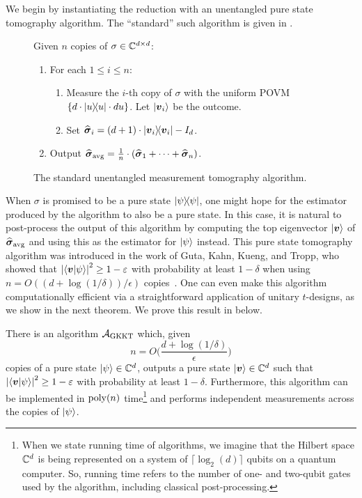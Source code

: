 \documentclass{article}
\newcommand{\gkkt}{\calA_{\mathrm{GKKT}}}
\begin{document}
We begin by instantiating the reduction with an unentangled pure state tomography algorithm.
The ``standard'' such algorithm is given in .

{
\begin{figure}[H]
Given $n$ copies of $\sigma \in \mathbb C^{d \times d}$:
\begin{enumerate}
    \item For each $1 \leq i \leq n$:
        \begin{enumerate}
            \item Measure the $i$-th copy of $\sigma$ with the uniform POVM $\{d \cdot \ketbra{u} \cdot du\}$. Let $\ket{\boldsymbol{v}_i}$ be the outcome.
            \item Set $\widehat{\boldsymbol{\sigma}}_i = (d+1) \cdot \ketbra{\boldsymbol{v}_i} - I_d$.
        \end{enumerate}
    \item Output $\widehat{\boldsymbol{\sigma}}_{\mathrm{avg}} = \frac{1}{n} \cdot (\widehat{\boldsymbol{\sigma}}_1 + \cdots + \widehat{\boldsymbol{\sigma}}_n)$.
\end{enumerate}
\caption{The standard unentangled measurement tomography algorithm.}
\label{fig:unentangled-tomography}
\end{figure}
}

\noindent
When $\sigma$ is promised to be a pure state $\ketbra{\psi}$,
one might hope for the estimator produced by the algorithm to also be a pure state.
In this case, it is natural to post-process the output of this algorithm by computing the top eigenvector $\ket{\boldsymbol{v}}$ of $\widehat{\boldsymbol{\sigma}}_{\mathrm{avg}}$
and using this as the estimator for $\ket{\psi}$ instead.
This pure state tomography algorithm was introduced in the work of Guta, Kahn, Kueng, and Tropp,
who showed that $\abs{\braket{\boldsymbol{v}}{\psi}}^2 \geq 1 - \varepsilon$ with probability at least $1 - \delta$ when using $n = O((d+ \log(1/\delta))/\epsilon)$ copies~\cite[Theorem 5]{GKKT20}.
One can even make this algorithm computationally efficient
via a straightforward application of unitary $t$-designs, as we show in the next theorem.
We prove this result in  below.

\begin{theorem}
    \label{thm:efficient-pure}
    There is an algorithm $\gkkt$ which, given
    \begin{equation*}
        n = O\Big(\frac{d + \log(1/\delta)}{\epsilon}\Big)
    \end{equation*}
    copies of a pure state $\ket{\psi} \in \mathbb C^d$,
    outputs a pure state $\ket{\boldsymbol{v}} \in \mathbb C^d$ such that $\abs{\braket{\boldsymbol{v}}{\psi}}^2 \geq 1 - \varepsilon$ with probability at least $1 - \delta$.
    Furthermore, this algorithm can be implemented in $\operatorname{poly}(n)$ time\footnote{
        When we state running time of algorithms, we imagine that the Hilbert space $\mathbb C^d$ is being represented on a system of $\lceil \log_2(d) \rceil$ qubits on a quantum computer.
        So, running time refers to the number of one- and two-qubit gates used by the algorithm, including classical post-processing.
    } and performs independent measurements across the copies of $\ket{\psi}$.
\end{theorem}
\end{document}
